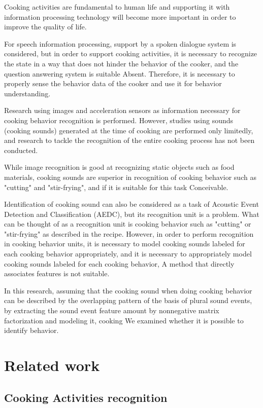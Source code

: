 \documentclass[sigchi]{acmart}
\begin{document}
Cooking activities are fundamental to human life and supporting it with information processing technology will become more important in order to improve the quality of life\cite{Uriu2012}.

For speech information processing, support by a spoken dialogue system is considered, but in order to support cooking activities, it is necessary to recognize the state in a way that does not hinder the behavior of the cooker, and the question answering system is suitable Absent. Therefore, it is necessary to properly sense the behavior data of the cooker and use it for behavior understanding.

Research using images and acceleration sensors as information necessary for cooking behavior recognition is performed\cite{Torre2008}\cite{Shimada2013}\cite{Kuehne2014}.
However, studies using sounds (cooking sounds) generated at the time of cooking are performed only limitedly\cite{Kojima2016}, and research to tackle the recognition of the entire cooking process has not been conducted.

While image recognition is good at recognizing static objects such as food materials, cooking sounds are superior in recognition of cooking behavior such as "cutting" and "stir-frying", and if it is suitable for this task Conceivable.

Identification of cooking sound can also be considered as a task of Acoustic Event Detection and Classification (AEDC), but its recognition unit is a problem.
What can be thought of as a recognition unit is cooking behavior such as "cutting" or "stir-frying" as described in the recipe. However, in order to perform recognition in cooking behavior units, it is necessary to model cooking sounds labeled for each cooking behavior appropriately, and it is necessary to appropriately model cooking sounds labeled for each cooking behavior, A method that directly associates features is not suitable\cite{Maijala2018}.

In this research, assuming that the cooking sound when doing cooking behavior can be described by the overlapping pattern of the basis of plural sound events, by extracting the sound event feature amount by nonnegative matrix factorization and modeling it, cooking We examined whether it is possible to identify behavior.

\section{Related work}
\subsection{Cooking Activities recognition}
\end{document}
